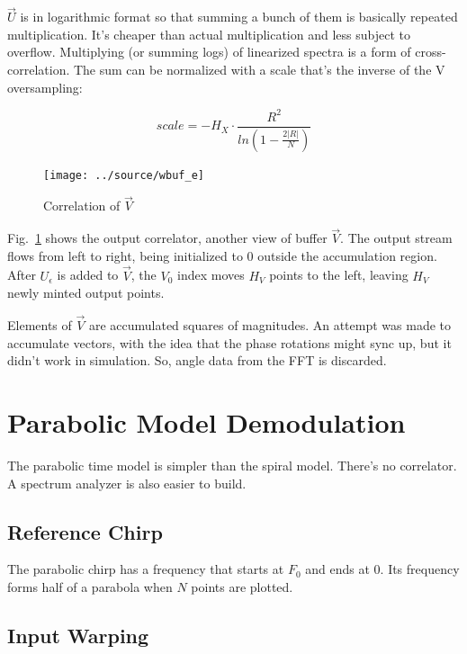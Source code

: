 $\vec{U}$ is in logarithmic format so that summing a bunch of them is basically 
repeated multiplication.
It's cheaper than actual multiplication and less subject to overflow.
Multiplying (or summing logs) of linearized spectra is a form of cross-correlation.
The sum can be normalized with a scale that's the inverse of the V oversampling:

\begin{equation}
scale = -H_X \cdot \frac{R^2}{ln(1 - \frac{2|R|}{N})}
\end{equation} %

\begin{figure}
    \centering
    \texttt{[image: ../source/wbuf\_e]}
    \caption[$\vec{V}$ correlation]{Correlation of $\vec{V}$}
    \label{fig:wbuf}
\end{figure}

Fig.~\ref{fig:wbuf} shows the output correlator, another view of buffer $\vec{V}$.
The output stream flows from left to right,
being initialized to 0 outside the accumulation region.
After $U_\epsilon$ is added to $\vec{V}$, the $V_0$ index moves $H_V$ points
to the left, leaving $H_V$ newly minted output points.

Elements of $\vec{V}$ are accumulated squares of magnitudes.
An attempt was made to accumulate vectors,
with the idea that the phase rotations might sync up,
but it didn't work in simulation.
So, angle data from the FFT is discarded.

\section{Parabolic Model Demodulation}

The parabolic time model is simpler than the spiral model.
There's no correlator. A spectrum analyzer is also easier to build.

\subsection{Reference Chirp}

The parabolic chirp has a frequency that starts at $F_0$ and ends at 0.
Its frequency forms half of a parabola when $N$ points are plotted.

\subsection{Input Warping}

